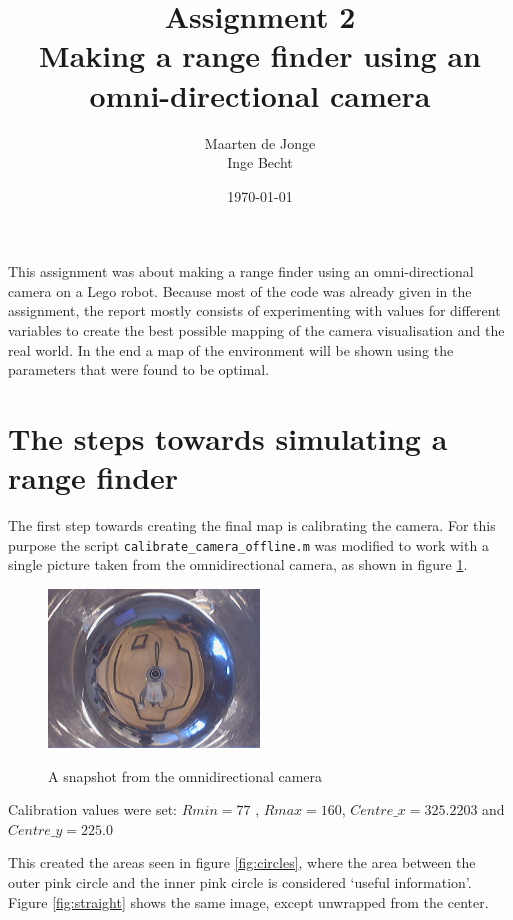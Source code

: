 \documentclass[a4paper, 20pt]{article}
\author{Maarten de Jonge \\
    Inge Becht}
\date{\today}
\title{Assignment 2\\ 
Making a range finder using an omni-directional camera }
\begin{document}
\maketitle

This assignment was about making a range finder using an omni-directional
camera on a Lego robot. 
Because most of the code was already given in the assignment, the report
mostly consists of experimenting with values for different variables to
create the best possible mapping of the camera visualisation and the real world.
In the end a map of the environment will be shown using the parameters that were
found to be optimal.

\section{The steps towards simulating a range finder}

The first step towards creating the final map is calibrating the camera. For
this purpose the script \texttt{calibrate\_camera\_offline.m} was modified to
work with a single picture taken from the omnidirectional camera, as shown in
figure \ref{fig:snapshot}.

\begin{figure}[!ht]
\centering
  \includegraphics[width=0.5\textwidth]{omni_snapshot.jpg}
  \label{fig:snapshot}
  \caption{A snapshot from the omnidirectional camera}
\end{figure}

Calibration values were set: $Rmin = 77$ , $Rmax = 160$, $Centre\_x = 325.2203$ and
$Centre\_y =  225.0$

This created the areas seen in figure \ref{fig:circles}, where the area between the
outer pink circle and
the inner pink circle is considered `useful information'. Figure
\ref{fig:straight} shows the same image, except unwrapped from the center.
\end{document}
